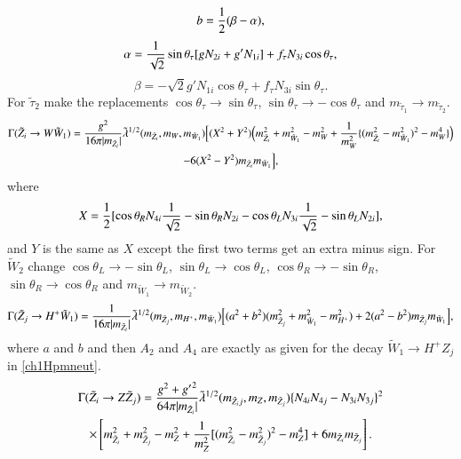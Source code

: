 \documentclass[final,3p,times,pdflatex]{elsarticle}
\begin{document}
\begin{equation}
b = {1 \over 2} (\beta - \alpha) ,
\end{equation}
\begin{equation}
\alpha = {1 \over \sqrt{2}} \sin \theta_\tau [g N_{2i} + g' N_{1i}] + f_\tau N_{3i} \cos \theta_\tau,
\end{equation}
\begin{equation}
\beta = -\sqrt{2} g' N_{1i} \cos \theta_\tau + f_\tau N_{3i} \sin \theta_\tau.
\end{equation}
For $\tilde{\tau}_2$ make the replacements $\cos\theta_\tau \rightarrow \sin\theta_\tau$, $\sin\theta_\tau \rightarrow -\cos\theta_\tau$ and $m_{\tilde{\tau}_1} \rightarrow m_{\tilde{\tau}_2}$.
\begin{multline}\label{neutWch1}
\Gamma (\tilde{Z}_i \rightarrow W \tilde{W}_{1}) = {g^2 \over 16\pi |m_{\tilde{Z}_i}|} \tilde{\lambda}^{1/2} (m_{\tilde{Z}_i}, m_W, m_{\tilde{W}_{1}}) \Big[(X^2 +Y^2) \Big(m_{\tilde{Z}_{i}}^2 + m_{\tilde{W}_1}^2 -m_W^2 + {1 \over m_W^2}\{(m_{\tilde{Z}_i}^2 - m_{\tilde{W}_1}^2)^2 - m_W^4\}\Big) \\ - 6(X^2 -Y^2)m_{\tilde{Z}_i}m_{\tilde{W}_1}\Big],
\end{multline} 
where
\begin{equation}
X = {1 \over 2}[\cos \theta_R N_{4i} {1 \over \sqrt{2}} - \sin \theta_R N_{2i} - \cos \theta_L N_{3i} {1 \over \sqrt{2}} - \sin \theta_L N_{2i}],
\end{equation}
and $Y$ is the same as $X$ except the first two terms get an extra minus sign. For $\tilde{W}_2$ change $\cos\theta_L \rightarrow -\sin\theta_L$, $\sin\theta_L \rightarrow \cos\theta_L$, $\cos\theta_R \rightarrow -\sin\theta_R$, $\sin\theta_R \rightarrow \cos\theta_R$ and $m_{\tilde{W}_1} \rightarrow m_{\tilde{W}_2}$.
\begin{equation}\label{neutHpmch1}
\Gamma (\tilde{Z}_j \rightarrow H^+ \tilde{W}_{1}) = {1 \over 16\pi |m_{\tilde{Z}_i}|} \tilde{\lambda}^{1/2} (m_{\tilde{Z}_j}, m_{H^+}, m_{\tilde{W}_{1}}) \Big[(a^2 +b^2) (m_{\tilde{Z}_{j}}^2 + m_{\tilde{W}_1}^2 -m_{H^+}^2) + 2(a^2 -b^2)m_{\tilde{Z}_j}m_{\tilde{W}_1}\Big],
\end{equation} 
where $a$ and $b$ and then $A_2$ and $A_4$ are exactly as given for the decay $\tilde{W}_1 \rightarrow H^+ Z_j$ in \eqref{ch1Hpmneut}.
\begin{multline}\label{neutZneut}
\Gamma (\tilde{Z}_i \rightarrow Z \tilde{Z}_{j}) = {g^2 + {g'}^2 \over 64\pi |m_{\tilde{Z}_i}|} \tilde{\lambda}^{1/2} (m_{\tilde{Z}_ij}, m_{Z}, m_{\tilde{Z}_{j}}) \{N_{4i}N_{4j} - N_{3i}N_{3j}\}^2 \\ \times \left[m_{\tilde{Z}_{i}}^2 + m_{\tilde{Z}_j}^2 -m_{Z}^2 +{1 \over m_Z^2}[(m_{\tilde{Z}_i}^2 - m_{\tilde{Z}_j}^2)^2 - m_Z^4] + 6m_{\tilde{Z}_i}m_{\tilde{Z}_j}\right].
\end{multline} 
\end{document}
